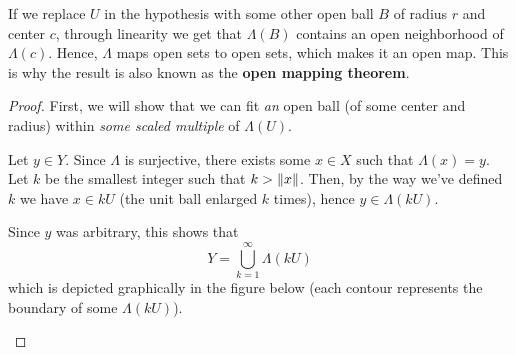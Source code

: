 \documentclass[a4paper, 12pt]{article}
\theoremstyle{definition}
\DeclarePairedDelimiter{\norm}{\lVert}{\rVert}
\begin{document}
If we replace \(U\) in the hypothesis with some other open ball \(B\) of radius \(r\) and center \(c\), through linearity we get that \(\Lambda(B)\) contains an open neighborhood of \(\Lambda(c)\). Hence, \(\Lambda\) maps open sets to open sets, which makes it an open map. This is why the result is also known as the \textbf{open mapping theorem}.

\begin{proof}
First, we will show that we can fit \emph{an} open ball (of some center and radius) within \emph{some scaled multiple} of \(\Lambda(U)\).

Let \(y \in Y\). Since \(\Lambda\) is surjective, there exists some \(x \in X\) such that \(\Lambda(x) = y\). Let \(k\) be the smallest integer such that \(k > \norm{x}\). Then, by the way we've defined \(k\) we have \(x \in kU\) (the unit ball enlarged \(k\) times), hence \(y \in \Lambda(kU)\).

Since \(y\) was arbitrary, this shows that
\begin{equation} \label{decomposition_of_y}
    Y = \bigcup_{k = 1}^{\infty} \Lambda (kU)
\end{equation}
which is depicted graphically in the figure below (each contour represents the boundary of some \(\Lambda(kU)\)).

\begin{figure}[h!]
    \centering
\end{figure}


\end{proof}
\end{document}
